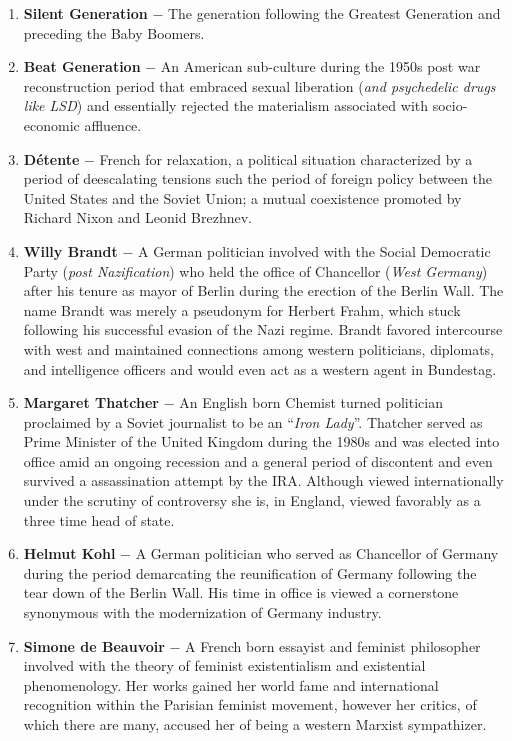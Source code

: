 \documentclass[12pt]{article}
\begin{document}
\begin{flushleft}
\begin{enumerate}
    \item \textbf{Silent Generation} $-$ The generation following the Greatest Generation and preceding the Baby Boomers.

    \item \textbf{Beat Generation} $-$ An American sub-culture during the 1950s post war reconstruction period that embraced sexual liberation (\emph{and psychedelic drugs like LSD}) and essentially rejected the materialism associated with socio-economic affluence. 

    \item \textbf{D\'etente} $-$ French for relaxation, a political situation characterized by a period of deescalating tensions such the period of foreign policy between the United States and the Soviet Union; a mutual coexistence promoted by Richard Nixon and Leonid Brezhnev.

    \item \textbf{Willy Brandt} $-$ A German politician involved with the Social Democratic Party (\emph{post Nazification}) who held the office of Chancellor (\emph{West Germany}) after his tenure as mayor of Berlin during the erection of the Berlin Wall. The name Brandt was merely a pseudonym for Herbert Frahm, which stuck following his successful evasion of the Nazi regime. Brandt favored intercourse with west and maintained connections among western politicians, diplomats, and intelligence officers and would even act as a western agent in Bundestag.

    \item \textbf{Margaret Thatcher} $-$ An English born Chemist turned politician proclaimed by a Soviet journalist to be an ``\emph{Iron Lady}''. Thatcher served as Prime Minister of the United Kingdom during the 1980s and was elected into office amid an ongoing recession and a general period of discontent and even survived a assassination attempt by the IRA. Although viewed internationally under the scrutiny of controversy she is, in England, viewed favorably as a three time head of state.    

    \item \textbf{Helmut Kohl} $-$ A German politician who served as Chancellor of Germany during the period demarcating the reunification of Germany following the tear down of the Berlin Wall. His time in office is viewed a cornerstone synonymous with the modernization of Germany industry.

    \item \textbf{Simone de Beauvoir} $-$ A French born essayist and feminist philosopher involved with the theory of feminist existentialism and existential phenomenology. Her works gained her world fame and international recognition within the Parisian feminist movement, however her critics, of which there are many, accused her of being a western Marxist sympathizer.


\end{enumerate}
\end{flushleft}
\end{document}
